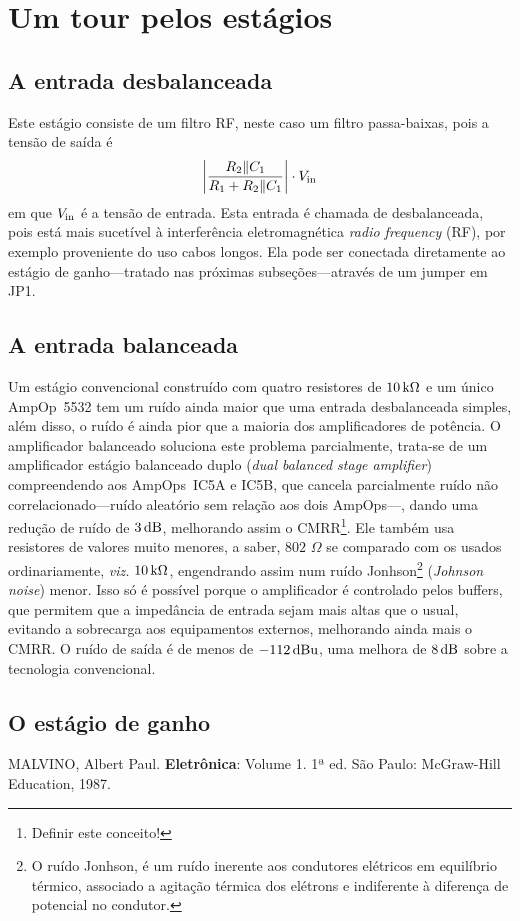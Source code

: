 \documentclass[12pt, a4paper, leqno, twoside]{book}
\def\ohm{\,\Omega}
\def\ampop{AmpOp}
\def\db{{\rm dB}}
\begin{document}
  \section{Um tour pelos est\'agios}
  \subsection{A entrada desbalanceada}

  Este est\'agio consiste de um filtro RF, neste caso um filtro passa-baixas, pois a tens\~ao de sa\'ida \'e 
  \begin{equation}
    \bigg|{R_2\|C_1\over R_1+R_2\|C_1}\bigg|\cdot V_{\rm in}
  \end{equation}
  em que $V_{\rm in}$ \'e a tens\~ao de entrada. Esta entrada \'e chamada de desbalanceada, pois est\'a mais sucet\'ivel \`a interfer\^encia eletromagn\'etica {\it radio frequency} (RF), por exemplo proveniente do uso cabos longos. Ela pode ser conectada diretamente ao est\'agio de ganho---tratado nas pr\'oximas subse\c c\~oes---atrav\'es de um jumper em JP1. 

  \subsection{A entrada balanceada}
  Um est\'agio convencional constru\'ido com quatro resistores de $10\,{\rm k}\Omega$ e um \'unico \ampop\ 5532 tem um ru\'ido ainda maior que uma entrada desbalanceada simples, al\'em disso, o ru\'ido \'e ainda pior que a maioria dos amplificadores de pot\^encia. O amplificador balanceado soluciona este problema parcialmente, trata-se de um amplificador est\'agio balanceado duplo ({\it dual balanced stage amplifier}) compreendendo aos \ampop{s}\ IC5A e IC5B, que cancela parcialmente ru\'ido n\~ao correlacionado---ru\'ido aleat\'orio sem rela\c c\~ao aos dois \ampop{s}---, dando uma redu\c c\~ao de ru\'ido de $3\,\db$, melhorando assim o CMRR\footnote{Definir este conceito!}. Ele tamb\'em usa resistores de valores muito menores, a saber, $802\,\ohm$ se comparado com os usados ordinariamente, {\it viz.} $10\,{\rm k}\Omega$, engendrando assim num ru\'ido Jonhson\footnote{O ru\'ido Jonhson, \'e um ru\'ido inerente aos condutores el\'etricos em equil\'ibrio t\'ermico, associado a agita\c c\~ao t\'ermica dos el\'etrons e indiferente \`a diferen\c ca de potencial no condutor.} ({\it Johnson noise}) menor. Isso s\'o \'e poss\'ivel porque o amplificador \'e controlado pelos buffers, que permitem que a imped\^ancia de entrada sejam mais altas que o usual, evitando a sobrecarga aos equipamentos externos, melhorando ainda mais o CMRR. O ru\'ido de sa\'ida \'e de menos de $-112\,\db{\rm u}$, uma melhora de $8\,\db$ sobre a tecnologia convencional.
  \subsection{O est\'agio de ganho}

  \begin{thebibliography}{}
    MALVINO, Albert Paul. {\bf Eletr\^onica\/}: Volume 1. 1ª ed. S\~ao Paulo: McGraw-Hill Education, 1987.
  \end{thebibliography}
\end{document}
